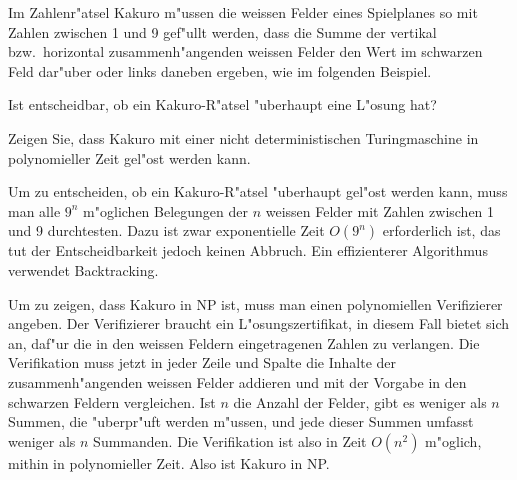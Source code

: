 Im Zahlenr"atsel Kakuro m"ussen die weissen Felder eines Spielplanes
so mit Zahlen zwischen 1 und 9 gef"ullt werden, dass die Summe der
vertikal bzw.~horizontal zusammenh"angenden weissen Felder den Wert im
schwarzen Feld dar"uber oder links daneben ergeben, wie im folgenden
Beispiel. 
\begin{center}
\end{center}
\begin{teilaufgaben}
\item 
Ist entscheidbar, ob ein Kakuro-R"atsel "uberhaupt eine L"osung
hat?
\item
Zeigen Sie, dass Kakuro mit einer nicht deterministischen Turingmaschine
in polynomieller Zeit gel"ost werden kann.
\end{teilaufgaben}

\begin{loesung}
\begin{teilaufgaben}
\item
Um zu entscheiden, ob ein Kakuro-R"atsel "uberhaupt gel"ost werden
kann, muss man alle $9^n$ m"oglichen Belegungen der $n$ weissen
Felder mit Zahlen zwischen 1 und 9 durchtesten. Dazu ist zwar
exponentielle Zeit $O(9^n)$ erforderlich ist, das tut der Entscheidbarkeit
jedoch keinen Abbruch.
Ein effizienterer Algorithmus verwendet Backtracking.
\item
Um zu zeigen, dass Kakuro in NP ist, muss man einen polynomiellen
Verifizierer angeben. Der Verifizierer braucht ein L"osungszertifikat,
in diesem Fall bietet sich an, daf"ur die in den weissen Feldern eingetragenen
Zahlen zu verlangen. Die Verifikation muss jetzt in jeder Zeile und
Spalte die Inhalte der zusammenh"angenden weissen Felder addieren und 
mit der Vorgabe in den schwarzen Feldern vergleichen. Ist $n$ die Anzahl
der Felder, gibt es weniger als $n$ Summen, die "uberpr"uft werden m"ussen,
und jede dieser Summen umfasst weniger als $n$ Summanden. Die Verifikation
ist also in Zeit $O(n^2)$ m"oglich, mithin in polynomieller Zeit.
Also ist Kakuro in NP.
\qedhere
\end{teilaufgaben}
\end{loesung}
